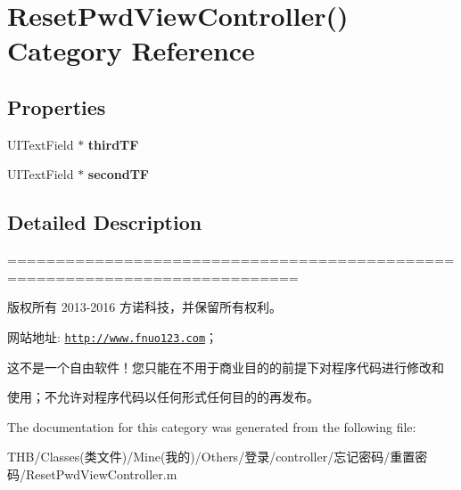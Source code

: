\hypertarget{category_reset_pwd_view_controller_07_08}{}\section{Reset\+Pwd\+View\+Controller() Category Reference}
\label{category_reset_pwd_view_controller_07_08}
\subsection*{Properties}
\begin{DoxyCompactItemize}
\item 
\mbox{\label{category_reset_pwd_view_controller_07_08_aa308feb0e92f162298b590d00d647819}} 
U\+I\+Text\+Field $\ast$ {\bfseries third\+TF}
\item 
\mbox{\label{category_reset_pwd_view_controller_07_08_ad012093d18acff7f185c35d03fb0aaa8}} 
U\+I\+Text\+Field $\ast$ {\bfseries second\+TF}
\end{DoxyCompactItemize}


\subsection{Detailed Description}
============================================================================

版权所有 2013-\/2016 方诺科技，并保留所有权利。

网站地址\+: \href{http://www.fnuo123.com}{\tt http\+://www.\+fnuo123.\+com}； 



这不是一个自由软件！您只能在不用于商业目的的前提下对程序代码进行修改和

使用；不允许对程序代码以任何形式任何目的的再发布。 

 

The documentation for this category was generated from the following file\+:\begin{DoxyCompactItemize}
\item 
T\+H\+B/\+Classes(类文件)/\+Mine(我的)/\+Others/登录/controller/忘记密码/重置密码/Reset\+Pwd\+View\+Controller.\+m\end{DoxyCompactItemize}
